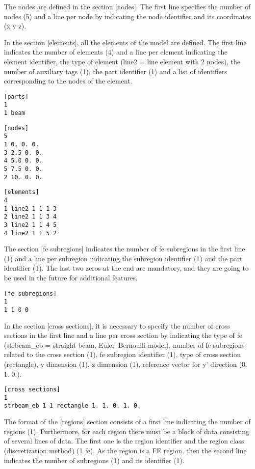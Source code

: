 \documentclass[a4]{article}
\begin{document}
The nodes are defined in the section [nodes]. The first line specifies the number of nodes (5) and a line per node by indicating the node identifier and its coordinates (x y z).    

In the section [elements], all the elements of the model are defined. The first line indicates the number of elements (4) and a line per element indicating the element identifier, the type of element (line2 = line element with 2 nodes), the number of auxiliary tags (1), the part identifier (1) and a list of identifiers corresponding to the nodes of the element.

\begin{Verbatim}	
[parts]
1
1 beam
\end{Verbatim}

\begin{Verbatim}	
[nodes]
5
1 0. 0. 0.
3 2.5 0. 0.
4 5.0 0. 0.
5 7.5 0. 0.
2 10. 0. 0.
\end{Verbatim}

\begin{Verbatim}	
[elements]
4
1 line2 1 1 1 3
2 line2 1 1 3 4
3 line2 1 1 4 5
4 line2 1 1 5 2
\end{Verbatim}

The section [fe subregions] indicates the number of fe subregions in the first line (1) and a line per subregion indicating the subregion identifier (1) and the part identifier (1). The last two zeros at the end are mandatory, and they are going to be used in the future for additional features.

\begin{Verbatim}
[fe subregions]
1
1 1 0 0
\end{Verbatim}

In the section [cross sections], it is necessary to specify the number of cross sections in the first line and a line per cross section by indicating the type of fe (strbeam\_eb = straight beam, Euler–Bernoulli model), number of fe subregions related to the cross section (1), fe subregion identifier (1), type of cross section (rectangle), y dimension (1), z dimension (1), reference vector for y' direction (0. 1. 0.).

\begin{Verbatim}
[cross sections]
1
strbeam_eb 1 1 rectangle 1. 1. 0. 1. 0.
\end{Verbatim}

The format of the [regions] section consists of a first line indicating the number of regions (1). Furthermore, for each region there must be a block of data consisting of several lines of data. The first one is the region identifier and the region class (discretization method) (1 fe). As the region is a FE region, then the second line indicates the number of subregions (1) and its identifier (1).
\end{document}
